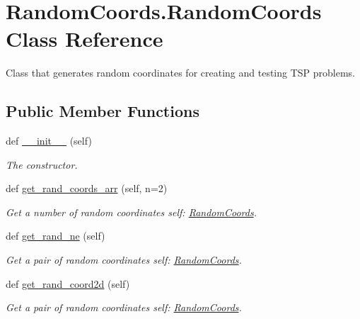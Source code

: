 \hypertarget{classRandomCoords_1_1RandomCoords}{}\section{Random\+Coords.\+Random\+Coords Class Reference}
\label{classRandomCoords_1_1RandomCoords}


Class that generates random coordinates for creating and testing T\+SP problems.  


\subsection*{Public Member Functions}
\begin{DoxyCompactItemize}
\item 
def \hyperlink{classRandomCoords_1_1RandomCoords_affcafc1cd38eef6073093ed430cebcf3}{\+\_\+\+\_\+init\+\_\+\+\_\+} (self)
\begin{DoxyCompactList}\small\item\em The constructor. \end{DoxyCompactList}\item 
def \hyperlink{classRandomCoords_1_1RandomCoords_adadcbdd1f667b67552fad916310404f5}{get\+\_\+rand\+\_\+coords\+\_\+arr} (self, n=2)
\begin{DoxyCompactList}\small\item\em Get a number of random coordinates  self\+: \hyperlink{classRandomCoords_1_1RandomCoords}{Random\+Coords}. \end{DoxyCompactList}\item 
def \hyperlink{classRandomCoords_1_1RandomCoords_a1b2cc7018aaaea85d0cf14dc6e66ed21}{get\+\_\+rand\+\_\+ne} (self)
\begin{DoxyCompactList}\small\item\em Get a pair of random coordinates  self\+: \hyperlink{classRandomCoords_1_1RandomCoords}{Random\+Coords}. \end{DoxyCompactList}\item 
def \hyperlink{classRandomCoords_1_1RandomCoords_a27a36aba4e239990fe8908ad092515f4}{get\+\_\+rand\+\_\+coord2d} (self)
\begin{DoxyCompactList}\small\item\em Get a pair of random coordinates  self\+: \hyperlink{classRandomCoords_1_1RandomCoords}{Random\+Coords}. \end{DoxyCompactList}\end{DoxyCompactItemize}


